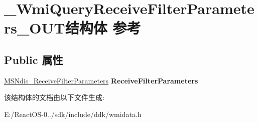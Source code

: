 \hypertarget{struct___wmi_query_receive_filter_parameters___o_u_t}{}\section{\+\_\+\+Wmi\+Query\+Receive\+Filter\+Parameters\+\_\+\+O\+U\+T结构体 参考}
\label{struct___wmi_query_receive_filter_parameters___o_u_t}
\subsection*{Public 属性}
\begin{DoxyCompactItemize}
\item 
\mbox{\label{struct___wmi_query_receive_filter_parameters___o_u_t_ac79b480a70c01b9c6710e87a70fa465f}} 
\hyperlink{struct___m_s_ndis___receive_filter_parameters}{M\+S\+Ndis\+\_\+\+Receive\+Filter\+Parameters} {\bfseries Receive\+Filter\+Parameters}
\end{DoxyCompactItemize}


该结构体的文档由以下文件生成\+:\begin{DoxyCompactItemize}
\item 
E\+:/\+React\+O\+S-\/0../sdk/include/ddk/wmidata.\+h\end{DoxyCompactItemize}
